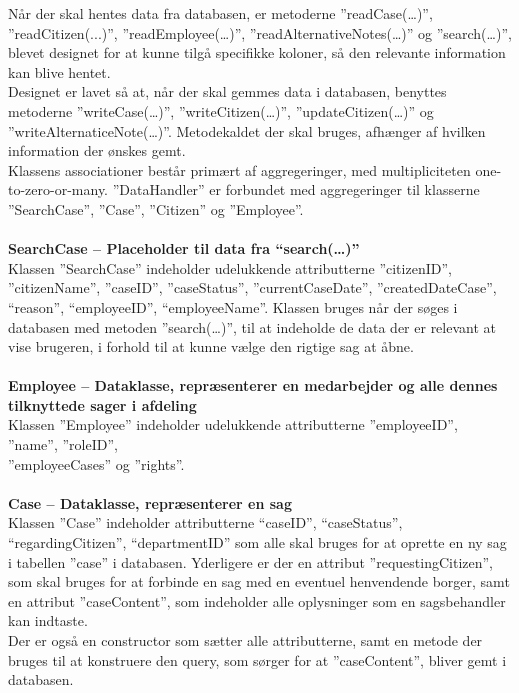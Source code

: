 Når der skal hentes data fra databasen, er metoderne ”readCase(…)”, ”readCitizen(...)”, ”readEmployee(…)”, ”readAlternativeNotes(…)” og ”search(…)”, blevet designet for at kunne tilgå specifikke koloner, så den relevante information kan blive hentet. \\
Designet er lavet så at, når der skal gemmes data i databasen, benyttes metoderne ”writeCase(…)”, ”writeCitizen(…)”, ”updateCitizen(…)” og ”writeAlternaticeNote(…)”. Metodekaldet der skal bruges, afhænger af hvilken information der ønskes gemt. \\
Klassens associationer består primært af aggregeringer, med multipliciteten one-to-zero-or-many. ”DataHandler” er forbundet med aggregeringer til klasserne ”SearchCase”, ”Case”, ”Citizen” og ”Employee”. \\\\
\textbf{SearchCase – Placeholder til data fra “search(…)”}\\
Klassen ”SearchCase” indeholder udelukkende attributterne ”citizenID”, ”citizenName”, ”caseID”, ”caseStatus”, ”currentCaseDate”, ”createdDateCase”, “reason”, “employeeID”, “employeeName”.  Klassen bruges når der søges i databasen med metoden ”search(…)”, til at indeholde de data der er relevant at vise brugeren, i forhold til at kunne vælge den rigtige sag at åbne.\\\\
\textbf{Employee – Dataklasse, repræsenterer en medarbejder og alle dennes tilknyttede sager i afdeling}\\
Klassen ”Employee” indeholder udelukkende attributterne ”employeeID”, ”name”, ”roleID”,\\ ”employeeCases” og ”rights”. \\\\
\textbf{Case – Dataklasse, repræsenterer en sag}\\
Klassen ”Case” indeholder attributterne “caseID”, “caseStatus”, “regardingCitizen”, “departmentID” som alle skal bruges for at oprette en ny sag i tabellen ”case” i databasen. Yderligere er der en attribut ”requestingCitizen”, som skal bruges for at forbinde en sag med en eventuel henvendende borger, samt en attribut ”caseContent”, som indeholder alle oplysninger som en sagsbehandler kan indtaste. \\
Der er også en constructor som sætter alle attributterne, samt en metode der bruges til at konstruere den query, som sørger for at ”caseContent”, bliver gemt i databasen.\\ \\
